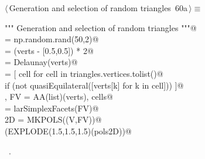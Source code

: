 \documentclass[11pt,oneside]{article}	%
\begin{document}
\begin{flushleft} \small \label{scrap115}
\protect{}$\langle\,$Generation and selection of random triangles\nobreak\ {\footnotesize 60a}$\,\rangle\equiv$
\vspace{-1ex}
\begin{list}{}{} \item
\mbox{}\verb@""" Generation and selection of random triangles """@\\
\mbox{}\verb@verts = np.random.rand(50,2)@\\
\mbox{}\verb@verts = (verts - [0.5,0.5]) * 2@\\
\mbox{}\verb@triangles = Delaunay(verts)@\\
\mbox{}\verb@cells = [ cell for cell in triangles.vertices.tolist()@\\
\mbox{}\verb@       if (not quasiEquilateral([verts[k] for k in cell])) ]@\\
\mbox{}\verb@V, FV = AA(list)(verts), cells@\\
\mbox{}\verb@EV = larSimplexFacets(FV)@\\
\mbox{}\verb@pols2D = MKPOLS((V,FV))@\\
\mbox{}\verb@VIEW(EXPLODE(1.5,1.5,1.5)(pols2D))@\\
\mbox{}\verb@@{\NWsep}
\end{list}
\vspace{-1ex}
\footnotesize\addtolength{\baselineskip}{-1ex}
\begin{list}{}{\setlength{\itemsep}{-\parsep}\setlength{\itemindent}{-\leftmargin}}
\item \NWtxtMacroRefIn\ .
\end{list}
\end{flushleft}
\end{document}
